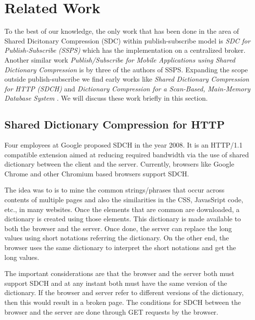 \section{Related Work}

To the best of our knowledge, the only work that has been done in the area of Shared Dicitonary Compression (SDC) within publish-subscribe model is \textit {SDC for Publish-Subscribe (SSPS)} \parencite{Doblander:2016:SDC} which has the implementation on a centralized broker. Another similar work \textit {Publish/Subscribe for Mobile Applications using Shared Dictionary Compression} \parencite{sdcdemo} is by three of the authors of SSPS. Expanding the scope outside publish-subscribe we find early works like \textit{Shared Dictionary Compression for HTTP (SDCH)} \parencite{sdch} and \textit{Dictionary Compression for a Scan-Based, Main-Memory Database System} \parencite{sdc_db}. We will discuss these work briefly in this section. 

\subsection{Shared Dictionary Compression for HTTP}

Four employees at Google proposed SDCH in the year 2008. It is an HTTP/1.1 compatible extension aimed at reducing required bandwidth via the use of shared dictionary between the client and the server.
Currently, browsers like Google Chrome and other Chromium based browsers support SDCH.

The idea was to is to mine the common strings/phrases that occur across contents of multiple pages and also the similarities in the CSS, JavasSript code, etc., in many websites.  Once the elements that are common are downloaded, a dictionary is created using those elements. This dictionary is made available to both the browser and the server. Once done, the server can replace the long values using short notations referring the dictionary. On the other end, the browser uses the same dictionary to interpret the short notations and get the long values. 

The important considerations are that the browser and the server both must support SDCH and at any instant both must have the same version of the dictionary. If the browser and server refer to different versions of the dictionary, then this would result in a broken page. The conditions for SDCH between the browser and the server are done through GET requests by the browser.

